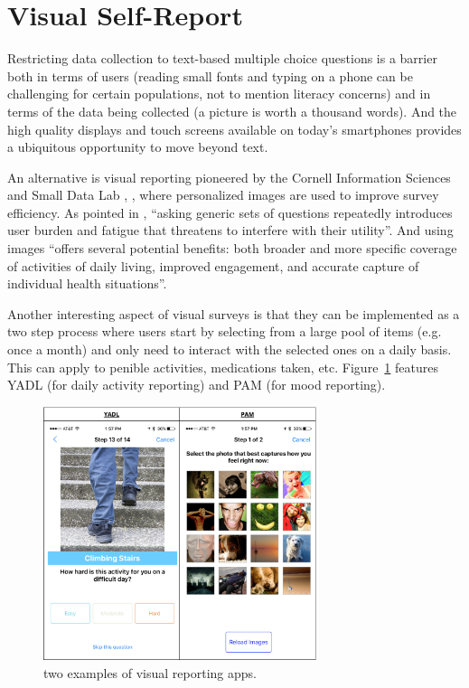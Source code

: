 \documentclass{acm_proc_article-sp}
\begin{document}
\section{Visual Self-Report}
Restricting data collection to text-based multiple choice questions is a barrier both in terms of users (reading small fonts and typing on a phone can be challenging for certain populations, not to mention literacy concerns) and in terms of the data being collected (a picture is worth a thousand words). And the high quality displays and touch screens  available on today’s smartphones provides a ubiquitous opportunity to move beyond text.

An alternative is visual reporting pioneered by the Cornell Information Sciences \cite{Aung2016-rx} and Small Data Lab \cite{Yang2016-dn}, \cite{noauthor_2015-gf} , where personalized images are used to improve survey efficiency.
As pointed in \cite{Yang2016-dn}, ``asking generic sets of questions repeatedly introduces user burden and fatigue that threatens to interfere with their utility''. And using images ``offers several potential benefits: both broader and more specific coverage of activities of daily living, improved engagement, and accurate capture of individual health situations''.

Another interesting aspect of visual surveys is that they can be implemented as a two step process where users start by selecting from a large pool of items (e.g. once a month) and only need to interact with the selected ones on a daily basis. This can apply to penible activities, medications taken, etc. Figure~\ref{fig::visual-apps} features YADL (for daily activity reporting) and PAM (for mood reporting).{}

\begin{figure}[h!]
\centering
\label{fig::visual-apps}
\includegraphics[width=8cm]{IMG/visual-apps.png}
\caption{two examples of visual reporting apps.}
\end{figure}
\end{document}
